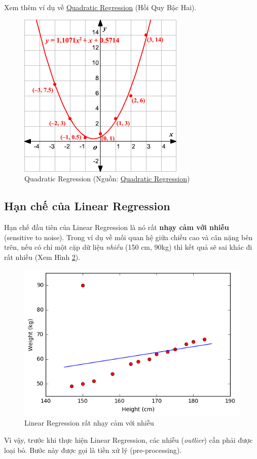 Xem thêm ví dụ về \href{http://www.varsitytutors.com/hotmath/hotmath_help/topics/quadratic-regression}{Quadratic Regression} (Hồi Quy Bậc Hai). 
 
 \begin{figure}
   \centering
   \includegraphics[width = .4\textwidth]{../LR/qr.png}
   \caption{Quadratic Regression (Nguồn: \href{http://www.varsitytutors.com/hotmath/hotmath_help/topics/quadratic-regression}{Quadratic Regression})}
   \label{fig:linearregression_qr}
 \end{figure}
 
\subsection{Hạn chế của Linear Regression}
 
Hạn chế đầu tiên của Linear Regression là nó rất \textbf{nhạy cảm với nhiễu} (sensitive to noise). Trong ví dụ về mối quan hệ giữa chiều cao và cân nặng bên trên, nếu có chỉ 
một cặp dữ liệu \textit{nhiễu} (150 cm, 90kg) thì kết quả sẽ sai khác đi rất nhiều (Xem Hình \ref{fig:linearregression_noise}). 
 
 \begin{figure}
 	\centering
 	\includegraphics[width = .6\textwidth]{../LR/output_13_1.png}
 	\caption{Linear Regression rất nhạy cảm với nhiễu}
 	\label{fig:linearregression_noise}
 \end{figure}
Vì vậy, trước khi thực hiện Linear Regression, các nhiễu (\textit{outlier}) cần 
 phải được loại bỏ. Bước này được gọi là tiền xử lý (pre-processing). 
 
